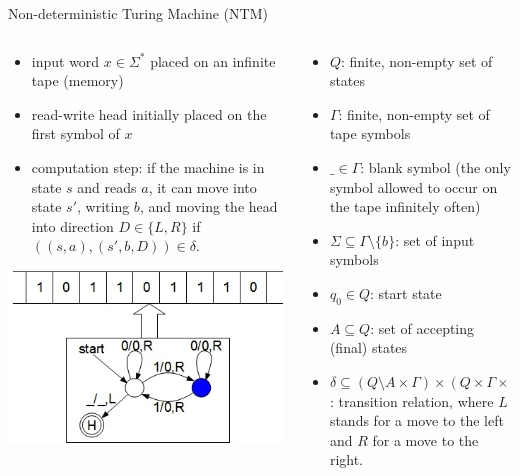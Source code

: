 \begin{frame}{Non-deterministic Turing Machine (NTM)}

	\begin{columns}
		\begin{column}[t]{.50\textwidth}
			\begin{itemize}
				\item \alert{input word} $x\in \Sigma^*$ placed on an \alert{infinite tape} (memory)
				\item read-write head initially placed on the first symbol of $x$
				\item computation step: if the machine is in state $s$ and reads $a$, it can move into state $s'$, writing $b$, and moving the head into direction $D \in \{L,R\}$ if $((s,a),(s',b,D)) \in \delta$.
			\end{itemize}
			\centering
			\includegraphics[scale=0.3]{./img/tm.jpg}
		\end{column}
		\begin{column}[t]{.50\textwidth}
			\begin{itemize}
				\item $Q$: finite, non-empty set of states
				\item $\Gamma$: finite, non-empty set of tape symbols
				\item $\_\in \Gamma$: blank symbol (the only symbol allowed to occur on the tape infinitely often)
				\item $\Sigma\subseteq\Gamma\setminus\{b\}$: set of input symbols
				\item $q_0 \in Q$: start state
				\item $A \subseteq Q$: set of accepting (final) states
				\item $\delta \subseteq (Q \setminus A \times \Gamma) \times (Q \times \Gamma \times \{L,R\})$: transition relation, where $L$ stands for a move to the left and $R$ for a move to the right.
			\end{itemize}
		\end{column}
	\end{columns}

\end{frame}

